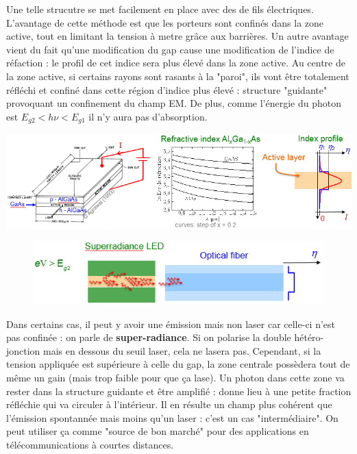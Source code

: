 		Une telle strucutre se met facilement en place avec des de fils électriques. L'avantage de
		cette méthode est que les porteurs sont confinés dans la zone active, tout en limitant la
		tension à metre grâce aux barrières. Un autre avantage vient du fait qu'une modification du 
		gap cause une modification de l'indice de réfaction : le profil de cet indice sera plus 
		élevé dans la zone active. Au centre de la zone active, si certains rayons sont rasants 
		à la "paroi", ils vont être totalement réfléchi et confiné dans cette région d'indice plus
		élevé : structure "guidante" provoquant un confinement du champ EM. De plus, comme 
		l'énergie du photon est $E_{g2} < h\nu < E_{g1}$ il n'y aura pas d'absorption.	
		\begin{center}
		\includegraphics[scale=0.7]{ch5/image40}
		\end{center}
	
	\begin{figure}
	\vspace{-5mm}
	\includegraphics[scale=0.6]{ch5/image41}
	\end{figure}	
		Dans certains cas, il peut y avoir une émission mais non laser car celle-ci n'est pas 
		confinée : on parle de \textbf{super-radiance}. Si on polarise la double hétéro-jonction 
		mais en dessous du seuil laser, cela ne lasera pas. Cependant, si la tension appliquée est
		supérieure à celle du gap, la zone centrale possèdera tout de même un gain (mais trop faible
		pour que ça lase). Un photon dans cette zone va rester dans la structure guidante et être
		amplifié : donne lieu à une petite fraction réfléchie qui va circuler à l'intérieur. Il en
		résulte un champ plus cohérent que l'émission spontannée mais moins qu'un laser : c'est 
		un cas "intermédiaire". On peut utiliser ça comme "source de bon marché" pour des applications
		en télécommunications à courtes distances.\\
		
